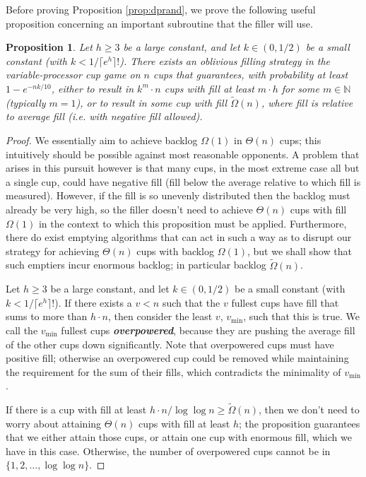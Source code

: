 \documentclass[twocolumn]{article}[11pt]
\newcommand{\defn}[1]{{\textit{\textbf{\boldmath #1}}}}
\newtheorem{proposition}{Proposition}
\begin{document}
Before proving Proposition \ref{prop:dprand}, we prove the following useful
proposition concerning an important subroutine that the filler will use.
\begin{proposition}
  \label{prop:tail}
  Let $h \ge 3$ be a large constant, and let $k \in (0,1/2)$ be a small
  constant (with $k<1/\lceil e^h \rceil!$). There exists an oblivious
  filling strategy in the variable-processor cup game on $n$ cups that
  guarantees, with probability at least $1-e^{-nk/10}$, either to result in
  $k^m\cdot n$ cups with fill at least $m\cdot h$ for some $m \in \mathbb{N}$
  (typically $m=1$), or to result in some cup with fill $\tilde{\Omega}(n)$,
  where fill is relative to average fill (i.e. with negative fill allowed).
\end{proposition}
\begin{proof}
  We essentially aim to achieve backlog $\Omega(1)$ in $\Theta(n)$ cups; this
  intuitively should be possible against most reasonable opponents.  A problem
  that arises in this pursuit however is that many cups, in the most extreme
  case all but a single cup, could have negative fill (fill below the average
  relative to which fill is measured). However, if the fill is so unevenly
  distributed then the backlog must already be very high, so the filler doesn't
  need to achieve $\Theta(n)$ cups with fill $\Omega(1)$ in the context to
  which this proposition must be applied. Furthermore, there do exist emptying
  algorithms that can act in such a way as to disrupt our strategy for
  achieving $\Theta(n)$ cups with backlog $\Omega(1)$, but we shall show that
  such emptiers incur enormous backlog; in particular backlog
  $\tilde{\Omega}(n)$.

  Let $h \ge 3$ be a large constant, and let $k \in (0,1/2)$ be a small
  constant (with $k<1/\lceil e^h \rceil!$).  If there exists a $v<n$
  such that the $v$ fullest cups have fill that sums to more than $h\cdot n$,
  then consider the least $v$, $v_{\min}$, such that this is true. We call the
  $v_{\min}$ fullest cups \defn{overpowered}, because they are pushing the
  average fill of the other cups down significantly. Note that overpowered cups
  must have positive fill; otherwise an overpowered cup could be removed while
  maintaining the requirement for the sum of their fills, which contradicts the
  minimality of $v_{\min}$.

  If there is a cup with fill at least $h\cdot n / \log\log n \ge
  \tilde{\Omega}(n)$, then we don't need to worry about attaining $\Theta(n)$
  cups with fill at least $h$; the proposition guarantees that we either attain
  those cups, or attain one cup with enormous fill, which we have in this case.
  Otherwise, the number of overpowered cups cannot be in $\{1, 2, \ldots, \log \log n\}$.


\end{proof}
\end{document}
